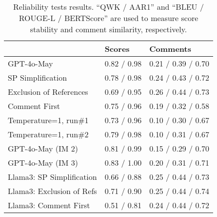 \begin{table}[]
    \centering
    \scriptsize
    
\begin{tabular}{p{2.65cm}|p{1.5cm}p{1.75cm}}
\toprule            
                   &  Scores &  Comments \\
\midrule
                 GPT-4o-May & 0.82 / 0.98 &  0.21 / 0.39 / 0.70  \\
           SP Simplification & 0.78 / 0.98 &  0.24 /    0.43 /       0.72 \\
                Exclusion of References & 0.69 / 0.95 &  0.26 /    0.44 /       0.73 \\
               Comment First & 0.75 / 0.96 &  0.19 /    0.32 /       0.58 \\
                  Temperature=1, run\#1 & 0.73 / 0.96 &  0.10 /    0.30 /       0.67 \\
                  Temperature=1, run\#2 & 0.79 / 0.98 &  0.10 /    0.31 /       0.67 \\ \midrule \midrule
             GPT-4o-May (IM 2) & 0.81 / 0.99 &  0.15 /    0.29 /       0.70 \\
             GPT-4o-May (IM 3) & 0.83 / 1.00 &  0.20 /    0.31 /       0.71 \\ \midrule \midrule
Llama3: SP Simplification & 0.66 / 0.88 &  0.25 /    0.44 /       0.73 \\
Llama3: Exclusion of Refs & 0.71 / 0.90 &  0.25 /    0.44 /       0.74 \\

Llama3: Comment First & 0.51 / 0.81 &  0.24 /    0.44 /       0.72 \\
\bottomrule
\end{tabular}
    
    \caption{Reliability tests results. ``QWK / AAR1'' and ``BLEU / ROUGE-L / BERTScore'' are used to measure score stability and comment similarity, respectively.}
    \label{tab:reliabilityResults}
\end{table}


